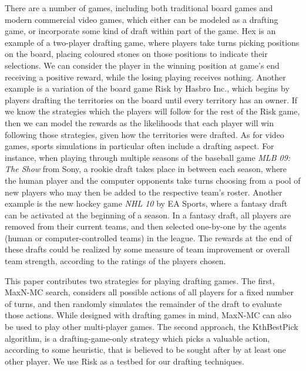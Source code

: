 \documentclass[letterpaper]{article}
\numberwithin{equation}{section}
\numberwithin{theorem}{section}
\numberwithin{lemma}{section}
\numberwithin{df}{section}
\begin{document}
There are a number of games, including both traditional board games and modern commercial video games, which either can be modeled as a drafting game, or incorporate some kind of draft within part of the game.  Hex is an example of a two-player drafting game, where players take turns picking positions on the board, placing coloured stones on those positions to indicate their selections.  We can consider the player in the winning position at game's end receiving a positive reward, while the losing playing receives nothing.  Another example is a variation of the board game Risk by Hasbro Inc., which begins by players drafting the territories on the board until every territory has an owner.  If we know the strategies which the players will follow for the rest of the Risk game, then we can model the rewards as the likelihoods that each player will win following those strategies, given how the territories were drafted.  As for video games, sports simulations in particular often include a drafting aspect.  For instance, when playing through multiple seasons of the baseball game \textit{MLB 09: The Show} from Sony, a rookie draft takes place in between each season, where the human player and the computer opponents take turns choosing from a pool of new players who may then be added to the respective team's roster.  Another example is the new hockey game \textit{NHL 10} by EA Sports, where a fantasy draft can be activated at the beginning of a season.  In a fantasy draft, all players are removed from their current teams, and then selected one-by-one by the agents (human or computer-controlled teams) in the league.  The rewards at the end of these drafts could be realized by some measure of team improvement or overall team strength, according to the ratings of the players chosen.

This paper contributes two strategies for playing drafting games.  The first, MaxN-MC search, considers all possible actions of all players for a fixed number of turns, and then randomly simulates the remainder of the draft to evaluate those actions.  While designed with drafting games in mind, MaxN-MC can also be used to play other multi-player games.  The second approach, the KthBestPick algorithm, is a drafting-game-only strategy which picks a valuable action, according to some heuristic, that is believed to be sought after by at least one other player.  We use Risk as a testbed for our drafting techniques.
\end{document}
